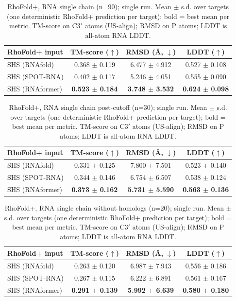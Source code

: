 \begin{table}[htbp]
\centering
\caption{RhoFold+, RNA single chain (n=90); single run. Mean $\pm$ s.d. over targets (one deterministic RhoFold+ prediction per target); bold = best mean per metric. TM-score on C3$'$ atoms (US-align); RMSD on P atoms; LDDT is all-atom RNA LDDT.}
\label{tab:rf_rna_single_chain}
\begin{tabular}{lccc}
\toprule
RhoFold+ input & TM-score ($\uparrow$) & RMSD (\AA, $\downarrow$) & LDDT ($\uparrow$) \\
\midrule
SHS (RNAfold) & 0.368 $\pm$ 0.119 & 6.477 $\pm$ 4.912 & 0.527 $\pm$ 0.108 \\
SHS (SPOT-RNA) & 0.402 $\pm$ 0.117 & 5.246 $\pm$ 4.051 & 0.555 $\pm$ 0.090 \\
SHS (RNAformer) & \textbf{0.523 $\pm$ 0.184} & \textbf{3.748 $\pm$ 3.532} & \textbf{0.624 $\pm$ 0.098} \\
\bottomrule
\end{tabular}
\end{table}

\begin{table}[htbp]
\centering
\caption{RhoFold+, RNA single chain post-cutoff (n=30); single run. Mean $\pm$ s.d. over targets (one deterministic RhoFold+ prediction per target); bold = best mean per metric. TM-score on C3$'$ atoms (US-align); RMSD on P atoms; LDDT is all-atom RNA LDDT.}
\label{tab:rf_rna_single_chain_post_cutoff}
\begin{tabular}{lccc}
\toprule
RhoFold+ input & TM-score ($\uparrow$) & RMSD (\AA, $\downarrow$) & LDDT ($\uparrow$) \\
\midrule
SHS (RNAfold) & 0.331 $\pm$ 0.125 & 7.800 $\pm$ 7.501 & 0.523 $\pm$ 0.140 \\
SHS (SPOT-RNA) & 0.344 $\pm$ 0.146 & 6.754 $\pm$ 6.507 & 0.538 $\pm$ 0.124 \\
SHS (RNAformer) & \textbf{0.373 $\pm$ 0.162} & \textbf{5.731 $\pm$ 5.590} & \textbf{0.563 $\pm$ 0.136} \\
\bottomrule
\end{tabular}
\end{table}

\begin{table}[htbp]
\centering
\caption{RhoFold+, RNA single chain without homologs (n=20); single run. Mean $\pm$ s.d. over targets (one deterministic RhoFold+ prediction per target); bold = best mean per metric. TM-score on C3$'$ atoms (US-align); RMSD on P atoms; LDDT is all-atom RNA LDDT.}
\label{tab:rf_rna_single_chain_without_homologs}
\begin{tabular}{lccc}
\toprule
RhoFold+ input & TM-score ($\uparrow$) & RMSD (\AA, $\downarrow$) & LDDT ($\uparrow$) \\
\midrule
SHS (RNAfold) & 0.263 $\pm$ 0.120 & 6.987 $\pm$ 7.943 & 0.556 $\pm$ 0.186 \\
SHS (SPOT-RNA) & 0.267 $\pm$ 0.115 & 6.222 $\pm$ 6.891 & 0.561 $\pm$ 0.167 \\
SHS (RNAformer) & \textbf{0.291 $\pm$ 0.139} & \textbf{5.992 $\pm$ 6.639} & \textbf{0.580 $\pm$ 0.180} \\
\bottomrule
\end{tabular}
\end{table}

